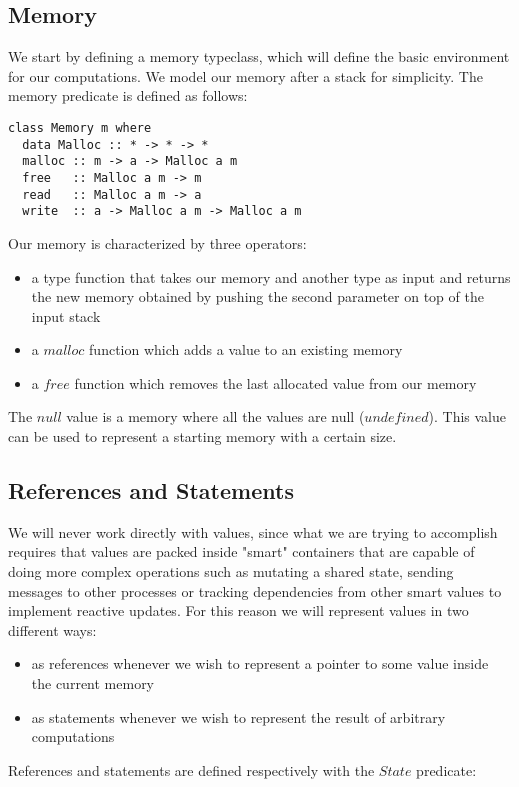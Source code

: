 \subsection{Memory}
We start by defining a memory typeclass, which will define the basic environment for our computations. We model our memory after a stack for simplicity. The memory predicate is defined as follows:

\begin{lstlisting}
class Memory m where
  data Malloc :: * -> * -> *
  malloc :: m -> a -> Malloc a m
  free   :: Malloc a m -> m
  read   :: Malloc a m -> a
  write  :: a -> Malloc a m -> Malloc a m
\end{lstlisting}

Our memory is characterized by three operators:
\begin{itemize}
\item a type function that takes our memory and another type as input and returns the new memory obtained by pushing the second parameter 
on top of the input stack
\item a $malloc$ function which adds a value to an existing memory
\item a $free$ function which removes the last allocated value from our memory
\end{itemize}

The $null$ value is a memory where all the values are null ($undefined$). This value can be used to represent a starting memory with a certain size.


\subsection{References and Statements}
We will never work directly with values, since what we are trying to accomplish requires that values are packed inside "smart" containers that are capable of doing more complex operations such as mutating a shared state, sending messages to other processes or tracking dependencies from other smart values to implement reactive updates. For this reason we will represent values in two different ways:
\begin{itemize}
\item as references whenever we wish to represent a pointer to some value inside the current memory
\item as statements whenever we wish to represent the result of arbitrary computations
\end{itemize}

References and statements are defined respectively with the $State$ predicate:

